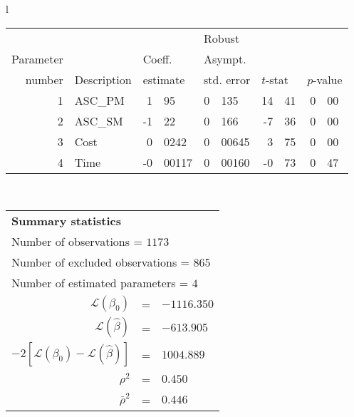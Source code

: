   \begin{tabular}{l}
\begin{tabular}{rlr@{.}lr@{.}lr@{.}lr@{.}l}
         &                       &   \multicolumn{2}{l}{}    & \multicolumn{2}{l}{Robust}  &     \multicolumn{4}{l}{}   \\
Parameter &                       &   \multicolumn{2}{l}{Coeff.}      & \multicolumn{2}{l}{Asympt.}  &     \multicolumn{4}{l}{}   \\
number &  Description                     &   \multicolumn{2}{l}{estimate}      & \multicolumn{2}{l}{std. error}  &   \multicolumn{2}{l}{$t$-stat}  &   \multicolumn{2}{l}{$p$-value}   \\

\hline

1 & ASC_PM  & 1&95 & 0&135 & 14&41 & 0&00\\
2 & ASC_SM & -1&22 & 0&166 & -7&36 & 0&00\\
3 & Cost & 0&0242 & 0&00645 & 3&75 & 0&00\\
4 & Time & -0&00117 & 0&00160 & -0&73 & 0&47\\
\hline
\end{tabular}
\\
\begin{tabular}{rcl}
\multicolumn{3}{l}{\bf Summary statistics}\\
\multicolumn{3}{l}{ Number of observations = $1173$} \\
\multicolumn{3}{l}{ Number of excluded observations = $865$} \\
\multicolumn{3}{l}{ Number of estimated  parameters = $4$} \\
 $\mathcal{L}(\beta_0)$ &=&  $-1116.350$ \\
 $\mathcal{L}(\hat{\beta})$ &=& $-613.905 $  \\
 $-2[\mathcal{L}(\beta_0) -\mathcal{L}(\hat{\beta})]$ &=& $1004.889$ \\
    $\rho^2$ &=&   $0.450$ \\
    $\bar{\rho}^2$ &=&    $0.446$ \\
\end{tabular}
  \end{tabular}
